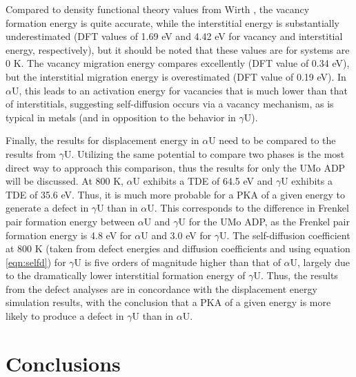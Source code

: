 \documentclass[review]{elsarticle}
\begin{document}
\FloatBarrier

Compared to density functional theory values from Wirth \cite{wirth2011}, the vacancy formation energy is quite accurate, while the interstitial energy is substantially underestimated (DFT values of 1.69 eV and 4.42 eV for vacancy and interstitial energy, respectively), but it should be noted that these values are for systems are 0 K. The vacancy migration energy compares excellently (DFT value of 0.34 eV), but the interstitial migration energy is overestimated (DFT value of 0.19 eV). In $\alpha$U, this leads to an activation energy for vacancies that is much lower than that of interstitials, suggesting self-diffusion occurs via a vacancy mechanism, as is typical in metals (and in opposition to the behavior in $\gamma$U). 

Finally, the results for displacement energy in $\alpha$U need to be compared to the results from $\gamma$U. Utilizing the same potential to compare two phases is the most direct way to approach this comparison, thus the results for only the UMo ADP will be discussed. At 800 K, $\alpha$U exhibits a TDE of 64.5 eV and $\gamma$U exhibits a TDE of 35.6 eV. Thus, it is much more probable for a PKA of a given energy to generate a defect in $\gamma$U than in $\alpha$U. This corresponds to the difference in Frenkel pair formation energy between $\alpha$U and $\gamma$U for the UMo ADP, as the Frenkel pair formation energy is 4.8 eV for $\alpha$U and 3.0 eV for $\gamma$U. The self-diffusion coefficient at 800 K (taken from defect energies and diffusion coefficients and using equation \ref{eqn:selfd}) for $\gamma$U is five orders of magnitude higher than that of $\alpha$U, largely due to the dramatically lower interstitial formation energy of $\gamma$U. Thus, the results from the defect analyses are in concordance with the displacement energy simulation results, with the conclusion that a PKA of a given energy is more likely to produce a defect in $\gamma$U than in $\alpha$U. 

\FloatBarrier

\section{Conclusions}
\end{document}
